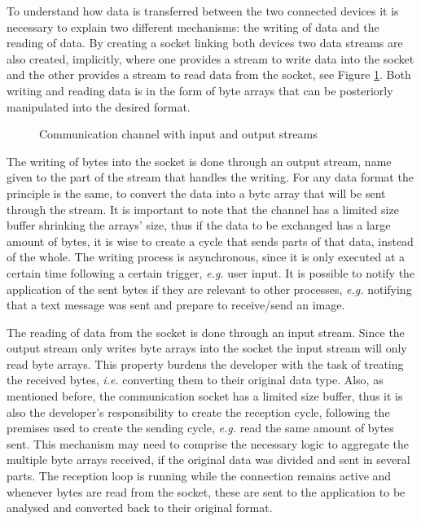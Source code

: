 To understand how data is transferred between the two connected devices it is necessary to explain two different mechanisms: the writing of data and the reading of data. By creating a socket linking both devices two data streams are also created, implicitly, where one provides a stream to write data into the socket and the other provides a stream to read data from the socket, see Figure \ref{fig:inoutstreams}. Both writing and reading data is in the form of byte arrays that can be posteriorly manipulated into the desired format.

\begin{figure}[ht]
	\noindent{}
	\caption{\label{fig:inoutstreams} Communication channel with input and output streams}
\end{figure}

The writing of bytes into the socket is done through an output stream, name given to the part of the stream that handles the writing. For any data format the principle is the same, to convert the data into a byte array that will be sent through the stream. It is important to note that the channel has a limited size buffer shrinking the arrays' size, thus if the data to be exchanged has a large amount of bytes, it is wise to create a cycle that sends parts of that data, instead of the whole. The writing process is asynchronous, since it is only executed at a certain time following a certain trigger, \textit{e.g.} user input. It is possible to notify the application of the sent bytes if they are relevant to other processes, \textit{e.g.} notifying that a text message was sent and prepare to receive/send an image.

The reading of data from the socket is done through an input stream. Since the output stream only writes byte arrays into the socket the input stream will only read byte arrays. This property burdens the developer with the task of treating the received bytes, \textit{i.e.} converting them to their original data type. Also, as mentioned before, the communication socket has a limited size buffer, thus it is also the developer's responsibility to create the reception cycle, following the premises used to create the sending cycle, \textit{e.g.} read the same amount of bytes sent. This mechanism may need to comprise the necessary logic to aggregate the multiple byte arrays received, if the original data was divided and sent in several parts. The reception loop is running while the connection remains active and whenever bytes are read from the socket, these are sent to the application to be analysed and converted back to their original format.

